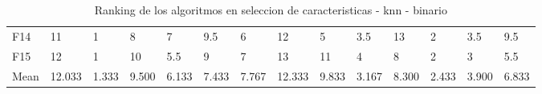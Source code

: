 \begin{table}
\begin{adjustbox}{width=\linewidth}
\begin{tabular}{llllllllllllll}
            F14  & 11     & 1     & 8     & 7     & 9.5   & 6     & 12     & 5     & 3.5   & 13    & 2     & 3.5   & 9.5   \\
            F15  & 12     & 1     & 10    & 5.5   & 9     & 7     & 13     & 11    & 4     & 8     & 2     & 3     & 5.5   \\
            Mean & 12.033 & 1.333 & 9.500 & 6.133 & 7.433 & 7.767 & 12.333 & 9.833 & 3.167 & 8.300 & 2.433 & 3.900 & 6.833 \\
            \bottomrule
        \end{tabular}
    \end{adjustbox}
    \caption{Ranking de los algoritmos en seleccion de caracteristicas - knn - binario}
    \label{tab:ranking_sel_rate_bin_knn}
\end{table}

